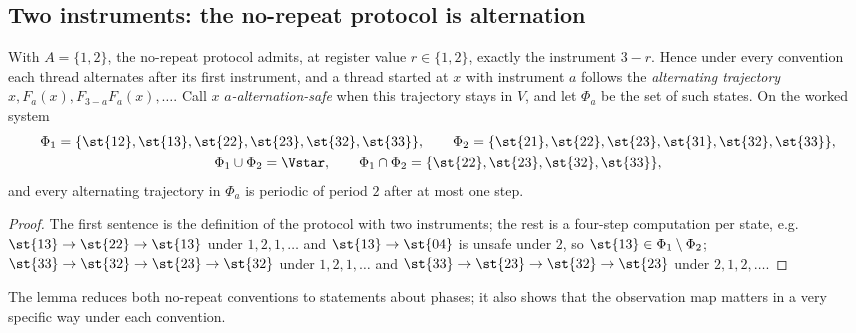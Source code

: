 \subsection{Two instruments: the no-repeat protocol is alternation}\label{sec:alt}

\begin{lemma}[alternation]\label{lem:alt}
With $A=\{1,2\}$, the no-repeat protocol admits, at register value $r\in\{1,2\}$, exactly the instrument $3-r$. Hence under every convention each thread alternates after its first instrument, and a thread started at $x$ with instrument $a$ follows the \emph{alternating trajectory} $x,F_a(x),F_{3-a}F_a(x),\dots$. Call $x$ \emph{$a$-alternation-safe} when this trajectory stays in $V$, and let $\Phi_a$ be the set of such states. On the worked system
\begin{gather*}
\Phi_1=\{\st{12},\st{13},\st{22},\st{23},\st{32},\st{33}\},\qquad
\Phi_2=\{\st{21},\st{22},\st{23},\st{31},\st{32},\st{33}\},\\
\Phi_1\cup\Phi_2=\Vstar,\qquad \Phi_1\cap\Phi_2=\{\st{22},\st{23},\st{32},\st{33}\},
\end{gather*}
and every alternating trajectory in $\Phi_a$ is periodic of period $2$ after at most one step.
\end{lemma}

\begin{proof}
The first sentence is the definition of the protocol with two instruments; the rest is a four-step computation per state, e.g.\ $\st{13}\to\st{22}\to\st{13}$ under $1,2,1,\dots$ and $\st{13}\to\st{04}$ is unsafe under $2$, so $\st{13}\in\Phi_1\setminus\Phi_2$; $\st{33}\to\st{32}\to\st{23}\to\st{32}$ under $1,2,1,\dots$ and $\st{33}\to\st{23}\to\st{32}\to\st{23}$ under $2,1,2,\dots$.
\end{proof}

The lemma reduces both no-repeat conventions to statements about phases; it also shows that the observation map matters in a very specific way under each convention.


